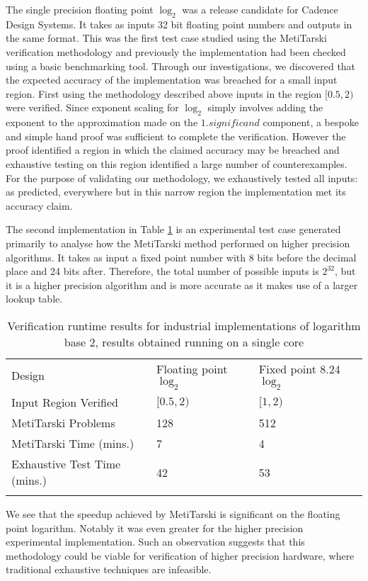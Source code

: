 \documentclass[smallcondensed]{svjour3}
\begin{document}
The single precision floating point $\log_2$ was a release candidate for Cadence Design Systems. It takes as inputs 32 bit floating point numbers and outputs in the same format. This was the first test case studied using the MetiTarski verification methodology and previously the implementation had been checked using a basic benchmarking tool. Through our investigations, we discovered that the expected accuracy of the implementation was breached for a small input region. First using the methodology described above inputs in the region $[0.5,2)$ were verified. Since exponent scaling for $\log_2$ simply involves adding the exponent to the approximation made on the $1.\textit{significand}$ component, a bespoke and simple hand proof was sufficient to complete the verification. However the proof identified a region in which the  claimed accuracy may be breached and exhaustive testing on this region identified a large number of counterexamples. For the purpose of validating our methodology, we exhaustively tested all inputs: as predicted, everywhere but in this narrow region the implementation met its accuracy claim.

The second implementation in Table \ref{result} is an experimental test case generated primarily to analyse how the MetiTarski method performed on higher precision algorithms. It takes as input a fixed point number with 8 bits before the decimal place and 24 bits after. Therefore, the total number of possible inputs is $2^{32}$, but it is a higher precision algorithm and is more accurate as it makes use of a larger lookup table.
\begin{table}[h]
\caption{Verification runtime results for industrial implementations of logarithm base 2, results obtained running on a single core}
\label{result}     
\begin{tabular}{lll}
\hline\noalign{\smallskip}
Design & Floating point $\log_2$ & Fixed point 8.24 $\log_2$    \\

\noalign{\smallskip}\hline\noalign{\smallskip}

 Input Region Verified& $[0.5,2)$ & $[1,2) $ \\ 
 MetiTarski Problems & 128 & 512 \\
 MetiTarski Time (mins.) &  7 & 4 \\ 
 Exhaustive Test Time (mins.) & 42 & 53 \\
\noalign{\smallskip}\hline
\end{tabular}
\end{table}
We see that the speedup achieved by MetiTarski is significant on the floating point logarithm. Notably it was even greater for the higher precision experimental implementation. Such an observation suggests that this methodology could be viable for verification of higher precision hardware, where traditional exhaustive techniques are infeasible. 
\end{document}
